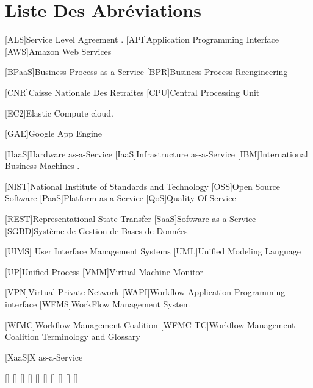  
 \chapter*{Liste Des Abréviations}
 \begin{acronym}
 		{Service Level Agreement} .	 
 	 	       [API]{Application Programming Interface}	
 		{Amazon Web Services}
 		
 		    [BPaaS]{Business Process as-a-Service}	 
 		{Business Process Reengineering} 
 		
 		   {Caisse Nationale Des Retraites}
 			[CPU]{Central Processing Unit}
 		
 [EC2]{Elastic Compute cloud}.
 		
 		  	[GAE]{Google App Engine}	
 		
 		[HaaS]{Hardware as-a-Service}
 		[IaaS]{Infrastructure as-a-Service}	
 	[IBM]{International Business Machines}	 .
 	
 	
 	
 	    [NIST]{National Institute of Standards and Technology} 
 	     	       [OSS]{Open Source Software}	
 	    			[PaaS]{Platform as-a-Service}	
 	   [QoS]{Quality Of Service}	

 	   
 	    	       [REST]{Representational State Transfer}
 	   	[SaaS]{Software as-a-Service}	
 	   	  [SGBD]{Système de Gestion de Bases de Données}

    	
    	
 [UIMS]{ User Interface Management Systems}
 	       [UML]{Unified Modeling Language}

 	    	       [UP]{Unified Process}
[VMM]{Virtual Machine Monitor}  

 	  [VPN]{Virtual Private Network}
[WAPI]{Workflow Application Programming interface}
    	[WFMS]{WorkFlow Management System}
    	
    	
    	[WfMC]{Workflow Management Coalition }
    	[WFMC-TC]{Workflow Management Coalition Terminology and Glossary}		
    
	[XaaS]{X as-a-Service}	

 	  
 	  
 	  
 	  
 
 	       	  



 	       \acro{}[]{}
 	       \acro{}[]{}
 	       \acro{}[]{}
 	       \acro{}[]{}
 	       \acro{}[]{}
 	       \acro{}[]{}
 	       \acro{}[]{}
 	       \acro{}[]{}
 	       \acro{}[]{}
 	       \acro{}[]{}
 	      
 	       
 \end{acronym}
 